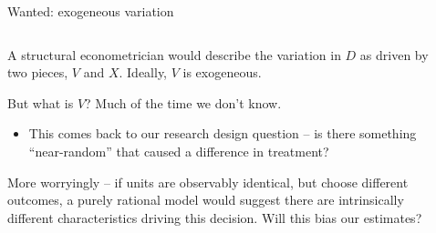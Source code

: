 \documentclass[notes,11pt, aspectratio=169]{beamer}
\newenvironment{wideitemize}{\itemize\addtolength{\itemsep}{10pt}}{\enditemize}
\begin{document}
\begin{frame}{Wanted: exogeneous variation}
\begin{columns}[T] %
\begin{column}{.7\textwidth}
  \begin{wideitemize}
  \item A structural econometrician would describe the variation in
    $D$ as driven by two pieces, $V$ and $X$. Ideally, $V$ is exogeneous.
  \item But what is $V$? Much of the time we don't know.
    \begin{itemize}
    \item This comes back to our research design question -- is there
      something ``near-random'' that caused a difference in treatment? 
    \end{itemize}
  \item More worryingly -- if units are observably identical, but
    choose different outcomes, a purely rational model would suggest
    there are intrinsically different characteristics driving this
    decision. Will this bias our estimates?
    \end{wideitemize}
\end{column}%
\hfill%
\begin{column}{.4\textwidth}

\end{column}%
\end{columns}
\end{frame}
\end{document}
